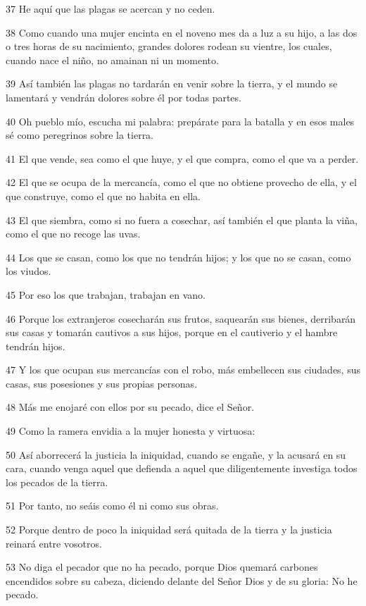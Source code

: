 \par 37 He aquí que las plagas se acercan y no ceden.
\par 38 Como cuando una mujer encinta en el noveno mes da a luz a su hijo, a las dos o tres horas de su nacimiento, grandes dolores rodean su vientre, los cuales, cuando nace el niño, no amainan ni un momento.
\par 39 Así también las plagas no tardarán en venir sobre la tierra, y el mundo se lamentará y vendrán dolores sobre él por todas partes.
\par 40 Oh pueblo mío, escucha mi palabra: prepárate para la batalla y en esos males sé como peregrinos sobre la tierra.
\par 41 El que vende, sea como el que huye, y el que compra, como el que va a perder.
\par 42 El que se ocupa de la mercancía, como el que no obtiene provecho de ella, y el que construye, como el que no habita en ella.
\par 43 El que siembra, como si no fuera a cosechar, así también el que planta la viña, como el que no recoge las uvas.
\par 44 Los que se casan, como los que no tendrán hijos; y los que no se casan, como los viudos.
\par 45 Por eso los que trabajan, trabajan en vano.
\par 46 Porque los extranjeros cosecharán sus frutos, saquearán sus bienes, derribarán sus casas y tomarán cautivos a sus hijos, porque en el cautiverio y el hambre tendrán hijos.
\par 47 Y los que ocupan sus mercancías con el robo, más embellecen sus ciudades, sus casas, sus posesiones y sus propias personas.
\par 48 Más me enojaré con ellos por su pecado, dice el Señor.
\par 49 Como la ramera envidia a la mujer honesta y virtuosa:
\par 50 Así aborrecerá la justicia la iniquidad, cuando se engañe, y la acusará en su cara, cuando venga aquel que defienda a aquel que diligentemente investiga todos los pecados de la tierra.
\par 51 Por tanto, no seáis como él ni como sus obras.
\par 52 Porque dentro de poco la iniquidad será quitada de la tierra y la justicia reinará entre vosotros.
\par 53 No diga el pecador que no ha pecado, porque Dios quemará carbones encendidos sobre su cabeza, diciendo delante del Señor Dios y de su gloria: No he pecado.
